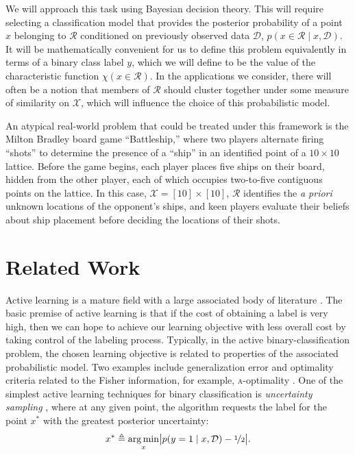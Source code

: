 \documentclass{article}
\newcommand{\cm}[1]{\mathcal{#1}}
\newcommand{\data}{\cm{D}}
\newcommand{\given}{\mid}
\newcommand{\deq}{\triangleq}
\DeclareMathOperator*{\argmin}{arg\,min}
\begin{document}
We will approach this task using Bayesian decision theory.  This will
require selecting a classification model that provides the posterior
probability of a point $x$ belonging to $\cm{R}$ conditioned on
previously observed data $\data$, $p(x \in \cm{R} \given x, \data)$.
It will be mathematically convenient for us to define this problem
equivalently in terms of a binary class label $y$, which we will
define to be the value of the characteristic function $\chi(x \in
\cm{R})$.  In the applications we consider, there will often be a
notion that members of $\cm{R}$ should cluster together under some
measure of similarity on $\cm{X}$, which will influence the choice of
this probabilistic model. 

An atypical real-world problem that could be treated under this
framework is the Milton Bradley board game ``Battleship,'' where two
players alternate firing ``shots'' to determine the presence of a
``ship'' in an identified point of a $10 \times 10$ lattice.  Before
the game begins, each player places five ships on their board, hidden
from the other player, each of which occupies two-to-five contiguous
points on the lattice.  In this case, $\cm{X} = [10] \times [10]$,
$\cm{R}$ identifies the \emph{a priori} unknown locations of the
opponent's ships, and keen players evaluate their beliefs about ship
placement before deciding the locations of their shots.

\section{Related Work}
\label{related}

Active learning is a mature field with a large associated body of
literature \citep{activesurvey}.  The basic premise of active learning
is that if the cost of obtaining a label is very high, then we can
hope to achieve our learning objective with less overall cost by
taking control of the labeling process.  Typically, in the active
binary-classification problem, the chosen learning objective is
related to properties of the associated probabilistic model.  Two
examples include generalization error \citep{zhuactivesemi} and
optimality criteria related to the Fisher information, for example,
\textsc{a}-optimality \citep{activelogistic}.  One of the simplest
active learning techniques for binary classification is
\emph{uncertainty sampling} \citep{uncertaintysampling}, where at any
given point, the algorithm requests the label for the point $x^\ast$
with the greatest posterior uncertainty:
\begin{equation*}
  x^\ast 
  \deq 
  \argmin_x 
  \bigl\lvert 
  p(y = 1 \given x, \data) - \nicefrac{1}{2}
  \bigr\rvert.
\end{equation*}
\end{document}
